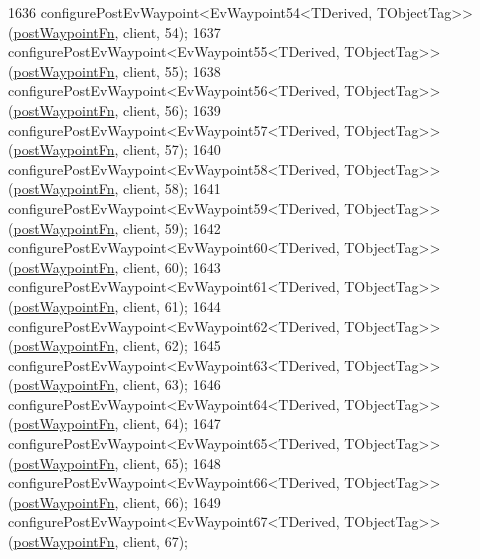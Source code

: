 \begin{DoxyCode}
1636     configurePostEvWaypoint<EvWaypoint54<TDerived, TObjectTag>>(\hyperlink{classcl__move__base__z_1_1WaypointEventDispatcher_a964a57fcce5d48ec60243230722d8dd7}{postWaypointFn}, client, 54);
1637     configurePostEvWaypoint<EvWaypoint55<TDerived, TObjectTag>>(\hyperlink{classcl__move__base__z_1_1WaypointEventDispatcher_a964a57fcce5d48ec60243230722d8dd7}{postWaypointFn}, client, 55);
1638     configurePostEvWaypoint<EvWaypoint56<TDerived, TObjectTag>>(\hyperlink{classcl__move__base__z_1_1WaypointEventDispatcher_a964a57fcce5d48ec60243230722d8dd7}{postWaypointFn}, client, 56);
1639     configurePostEvWaypoint<EvWaypoint57<TDerived, TObjectTag>>(\hyperlink{classcl__move__base__z_1_1WaypointEventDispatcher_a964a57fcce5d48ec60243230722d8dd7}{postWaypointFn}, client, 57);
1640     configurePostEvWaypoint<EvWaypoint58<TDerived, TObjectTag>>(\hyperlink{classcl__move__base__z_1_1WaypointEventDispatcher_a964a57fcce5d48ec60243230722d8dd7}{postWaypointFn}, client, 58);
1641     configurePostEvWaypoint<EvWaypoint59<TDerived, TObjectTag>>(\hyperlink{classcl__move__base__z_1_1WaypointEventDispatcher_a964a57fcce5d48ec60243230722d8dd7}{postWaypointFn}, client, 59);
1642     configurePostEvWaypoint<EvWaypoint60<TDerived, TObjectTag>>(\hyperlink{classcl__move__base__z_1_1WaypointEventDispatcher_a964a57fcce5d48ec60243230722d8dd7}{postWaypointFn}, client, 60);
1643     configurePostEvWaypoint<EvWaypoint61<TDerived, TObjectTag>>(\hyperlink{classcl__move__base__z_1_1WaypointEventDispatcher_a964a57fcce5d48ec60243230722d8dd7}{postWaypointFn}, client, 61);
1644     configurePostEvWaypoint<EvWaypoint62<TDerived, TObjectTag>>(\hyperlink{classcl__move__base__z_1_1WaypointEventDispatcher_a964a57fcce5d48ec60243230722d8dd7}{postWaypointFn}, client, 62);
1645     configurePostEvWaypoint<EvWaypoint63<TDerived, TObjectTag>>(\hyperlink{classcl__move__base__z_1_1WaypointEventDispatcher_a964a57fcce5d48ec60243230722d8dd7}{postWaypointFn}, client, 63);
1646     configurePostEvWaypoint<EvWaypoint64<TDerived, TObjectTag>>(\hyperlink{classcl__move__base__z_1_1WaypointEventDispatcher_a964a57fcce5d48ec60243230722d8dd7}{postWaypointFn}, client, 64);
1647     configurePostEvWaypoint<EvWaypoint65<TDerived, TObjectTag>>(\hyperlink{classcl__move__base__z_1_1WaypointEventDispatcher_a964a57fcce5d48ec60243230722d8dd7}{postWaypointFn}, client, 65);
1648     configurePostEvWaypoint<EvWaypoint66<TDerived, TObjectTag>>(\hyperlink{classcl__move__base__z_1_1WaypointEventDispatcher_a964a57fcce5d48ec60243230722d8dd7}{postWaypointFn}, client, 66);
1649     configurePostEvWaypoint<EvWaypoint67<TDerived, TObjectTag>>(\hyperlink{classcl__move__base__z_1_1WaypointEventDispatcher_a964a57fcce5d48ec60243230722d8dd7}{postWaypointFn}, client, 67);

\end{DoxyCode}
